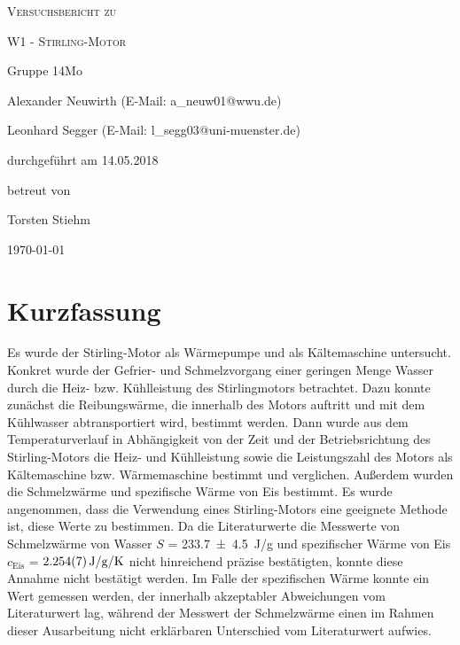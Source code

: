 \documentclass[
	a4paper,
	12pt,
	pagesize,
	ngerman
]{scrartcl}
\begin{document}
	
	\begin{titlepage}
		\centering
		{\scshape\LARGE Versuchsbericht zu \par}
		\vspace{1cm}
		{\scshape\huge W1 - Stirling-Motor \par} 
		\vspace{2.5cm}
		{\LARGE Gruppe 14Mo \par}
		\vspace{0.5cm}
		
		{\large Alexander Neuwirth (E-Mail: a\_neuw01@wwu.de) \par}
		{\large Leonhard Segger (E-Mail: l\_segg03@uni-muenster.de) \par}
		\vfill
		
		durchgeführt am 14.05.2018\par 
		betreut von\par
		{\large Torsten Stiehm} 
		
		\vfill
		
		{\large \today\par}
	\end{titlepage}
	\tableofcontents
	\newpage

	\section{Kurzfassung}
	Es wurde der Stirling-Motor als Wärmepumpe und als Kältemaschine untersucht.
	Konkret wurde der Gefrier- und Schmelzvorgang einer geringen Menge Wasser durch die Heiz- bzw. Kühlleistung des Stirlingmotors betrachtet.
	Dazu konnte zunächst die Reibungswärme, die innerhalb des Motors auftritt und mit dem Kühlwasser abtransportiert wird, bestimmt werden.
	Dann wurde aus dem Temperaturverlauf in Abhängigkeit von der Zeit und der Betriebsrichtung des Stirling-Motors die Heiz- und Kühlleistung sowie die Leistungszahl des Motors als Kältemaschine bzw. Wärmemaschine bestimmt und verglichen.
	Außerdem wurden die Schmelzwärme und spezifische Wärme von Eis bestimmt.
	Es wurde angenommen, dass die Verwendung eines Stirling-Motors eine geeignete Methode ist, diese Werte zu bestimmen.
	Da die Literaturwerte die Messwerte von Schmelzwärme von Wasser $S$ = \SI{233,7\pm 4,5}{J/g} und spezifischer Wärme von Eis $c_\text{Eis}$ = $\SI{2,254+-0,007}{J/g/K}$ nicht hinreichend präzise bestätigten, konnte diese Annahme nicht bestätigt werden.
	Im Falle der spezifischen Wärme konnte ein Wert gemessen werden, der innerhalb akzeptabler Abweichungen vom Literaturwert lag, während der Messwert der Schmelzwärme einen im Rahmen dieser Ausarbeitung nicht erklärbaren Unterschied vom Literaturwert aufwies.
	
\end{document}
